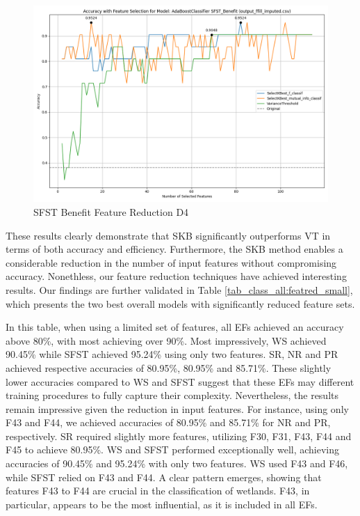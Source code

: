 \documentclass[12pt,letterpaper]{article}
\begin{document}
\begin{figure}[h]
    \centering
    \includegraphics[width=0.85\linewidth]{class_all_section/feature_selection_accuracy_plot_output_ffill_imputedcsv_AdaBoostClassifier_SFST_Benefit.png}
    \caption{SFST Benefit Feature Reduction D4}
    \label{class_all_tab:featred_sfst_big}
\end{figure}

These results clearly demonstrate that \ac{SKB} significantly outperforms \ac{VT} in terms of both accuracy and efficiency.
Furthermore, the \ac{SKB} method enables a considerable reduction in the number of input features without compromising accuracy.
Nonethless, our feature reduction techniques have achieved interesting results.
Our findings are further validated in Table \ref{tab_class_all:featred_small}, which presents the two best overall models with significantly reduced feature sets.



In this table, when using a limited set of features, all \acp{EF} achieved an accuracy above 80\%, with most achieving over 90\%.
Most impressively, \ac{WS} achieved 90.45\% while \ac{SFST} achieved 95.24\% using only two features.
\ac{SR}, \ac{NR} and \ac{PR} achieved respective accuracies of 80.95\%, 80.95\% and 85.71\%.
These slightly lower accuracies compared to \ac{WS} and \ac{SFST} suggest that these \ac{EF}s may different training procedures to fully capture their complexity.
Nevertheless, the results remain impressive given the reduction in input features.
For instance, using only F43 and F44, we achieved accuracies of 80.95\% and 85.71\% for \ac{NR} and \ac{PR}, respectively.
\ac{SR} required slightly more features, utilizing F30, F31, F43, F44 and F45 to achieve 80.95\%.
\ac{WS} and \ac{SFST} performed exceptionally well, achieving accuracies of 90.45\% and 95.24\% with only two features.
\ac{WS} used F43 and F46, while \ac{SFST} relied on F43 and F44.
A clear pattern emerges, showing that features F43 to F44 are crucial in the classification of wetlands.
F43, in particular, appears to be the most influential, as it is included in all \acp{EF}.
\end{document}
